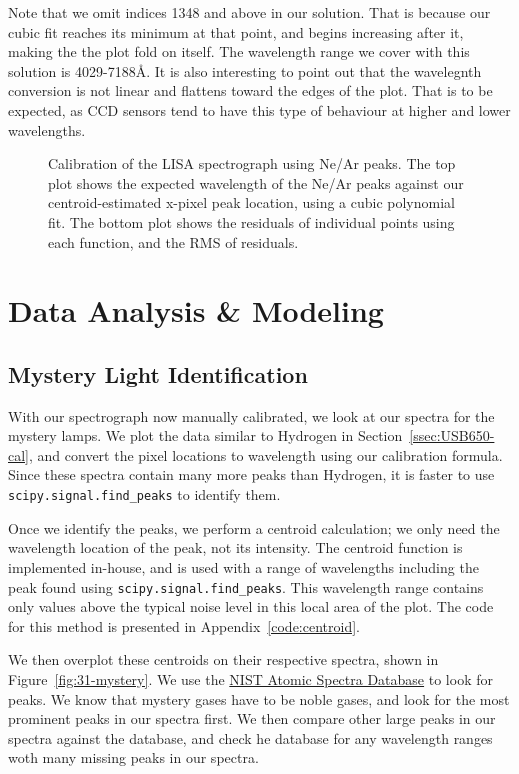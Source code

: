 \documentclass[twocolumn]{aastex702}
\begin{document}
			Note that we omit indices 1348 and above in our solution. That is because our cubic fit reaches its minimum at that point, and begins increasing after it, making the the plot fold on itself. The wavelength range we cover with this solution is 4029-7188Å. It is also interesting to point out that the wavelegnth conversion is not linear and flattens toward the edges of the plot. That is to be expected, as CCD sensors tend to have this type of behaviour at higher and lower wavelengths.
		
			\begin{figure}
				\caption{Calibration of the LISA spectrograph using Ne/Ar peaks. The top plot shows the expected wavelength of the Ne/Ar peaks against our centroid-estimated x-pixel peak location, using a cubic polynomial fit. The bottom plot shows the residuals of individual points using each function, and the RMS of residuals.}
				\label{fig:near-res}
			\end{figure}
		
  \section{Data Analysis \& Modeling}\label{sec:anal}
			
		\subsection{Mystery Light Identification}\label{ssec:USB650-mystery}
		
			With our spectrograph now manually calibrated, we look at our spectra for the mystery lamps. We plot the data similar to Hydrogen in Section~\ref{ssec:USB650-cal}, and convert the pixel locations to wavelength using our calibration formula. Since these spectra contain many more peaks than Hydrogen, it is faster to use \texttt{scipy.signal.find\_peaks} to identify them. 

			Once we identify the peaks, we perform a centroid calculation; we only need the wavelength location of the peak, not its intensity. The centroid function is implemented in-house, and is used with a range of wavelengths including the peak found using \texttt{scipy.signal.find\_peaks}. This wavelength range contains only values above the typical noise level in this local area of the plot. The code for this method is presented in Appendix~\ref{code:centroid}.
			
			We then overplot these centroids on their respective spectra, shown in Figure~\ref{fig:31-mystery}. We use the \href{https://physics.nist.gov/PhysRefData/ASD/lines_form.html}{NIST Atomic Spectra Database} to look for peaks. We know that mystery gases have to be noble gases, and look for the most prominent peaks in our spectra first. We then compare other large peaks in our spectra against the database, and check he database for any wavelength ranges woth many missing peaks in our spectra.
\end{document}
